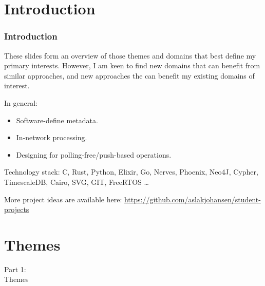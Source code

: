 \section{Introduction}
\begin{frame}
    \frametitle{Introduction}
    \vspace{3mm}
    These slides form an overview of those themes and domains that best define my primary interests. However, I am keen to find new domains that can benefit from similar approaches, and new approaches the can benefit my existing domains of interest.
    
    \vspace{3mm}
    In general:
    \begin{itemize}
      \item Software-define metadata.
      \item In-network processing.
      \item Designing for polling-free/push-based operations.
    \end{itemize}
    
    \vspace{3mm}
    Technology stack: C, Rust, Python, Elixir, Go, Nerves, Phoenix, Neo4J, Cypher, TimescaleDB, Cairo, SVG, GIT, FreeRTOS \ldots
    
    \vspace{3mm}
    More project ideas are available here: \url{https://github.com/aslakjohansen/student-projects}
\end{frame}

\section{Themes}
\begin{frame}
    \vspace{25mm}
    \begin{center}
        \Huge{Part 1:\\Themes}
    \end{center}
\end{frame}

